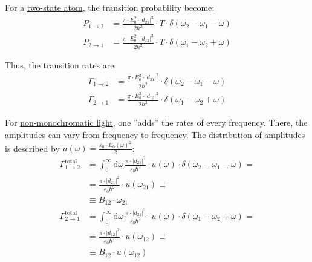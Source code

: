 \documentclass{article}
\newcommand{\diff}{\mathrm{d}}
\begin{document}
{	For a \underline{two-state atom}, the transition probability become:
		\begin{align*}
			P_{1\to 2} &= \frac{\pi \cdot E_0^2 \cdot |d_{21}|^2}{2\hbar^2} \cdot T \cdot \delta(\omega_2 - \omega_1 - \omega) \\
			P_{2\to 1} &= \frac{\pi \cdot E_0^2 \cdot |d_{12}|^2}{2\hbar^2} \cdot T \cdot \delta(\omega_1 - \omega_2 + \omega)
		\end{align*}
	
	Thus, the transition rates are:
		\begin{align*}
			\Gamma_{1\to 2} &= \frac{\pi \cdot E_0^2 \cdot |d_{21}|^2}{2\hbar^2} \cdot \delta(\omega_2 - \omega_1 - \omega) \\
			\Gamma_{2\to 1} &= \frac{\pi \cdot E_0^2 \cdot |d_{12}|^2}{2\hbar^2} \cdot \delta(\omega_1 - \omega_2 + \omega)
		\end{align*}

	For \underline{non-monochromatic light}, one ''adds'' the rates of every frequency. There, the amplitudes can vary from frequency to frequency. The distribution of amplitudes is described by $u(\omega) = \frac{\varepsilon_0 \cdot E_0(\omega)^2}{2}$:
		\begin{align*}
			\Gamma_{1\to 2}^\text{total} &= \int_0^\infty \diff\omega \, \frac{\pi \cdot |d_{21}|^2}{\varepsilon_0\hbar^2} \cdot u(\omega) \cdot \delta(\omega_2 - \omega_1 - \omega) = \\
			&= \frac{\pi \cdot |d_{21}|^2}{\varepsilon_0\hbar^2} \cdot u(\omega_{21}) \equiv\\
			&\equiv B_{12} \cdot \omega_{21} \\
			\Gamma_{2\to 1}^\text{total} &= \int_0^\infty \diff\omega \, \frac{\pi \cdot |d_{21}|^2}{\varepsilon_0\hbar^2} \cdot u(\omega) \cdot \delta(\omega_1 - \omega_2 + \omega) = \\
			&= \frac{\pi \cdot |d_{12}|^2}{\varepsilon_0\hbar^2} \cdot u(\omega_{12}) \equiv \\
			&\equiv B_{12} \cdot u(\omega_{12})
		\end{align*}
	
}
\end{document}

